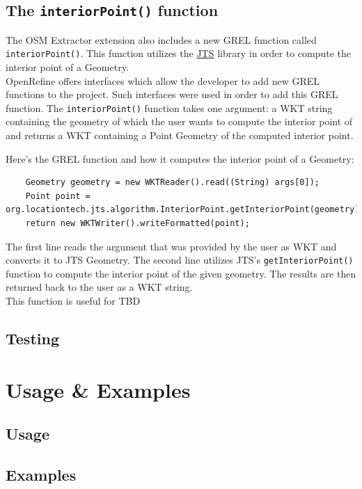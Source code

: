 \subsection{The \texttt{interiorPoint()} function}
The OSM Extractor extension also includes a new GREL function called \texttt{interiorPoint()}. This function
utilizes the \href{https://github.com/locationtech/jts}{JTS} library in order to compute the interior point of a Geometry.\\
\newline
OpenRefine offers interfaces which allow the developer to add new GREL functions to the project. Such interfaces were used in order
to add this GREL function. The \texttt{interiorPoint()} function takes one argument: a WKT string containing the geometry
of which the user wants to compute the interior point of and returns a WKT containing a Point Geometry of the computed interior point.\\
\newline

Here's the GREL function and how it computes the interior point of a Geometry:
\begin{verbatim}
    Geometry geometry = new WKTReader().read((String) args[0]);
    Point point = org.locationtech.jts.algorithm.InteriorPoint.getInteriorPoint(geometry);
    return new WKTWriter().writeFormatted(point);
\end{verbatim}
The first line reads the argument that was provided by the user as WKT and converts it to JTS Geometry.
The second line utilizes JTS's \texttt{getInteriorPoint()} function to compute the interior point of the
given geometry. The results are then returned back to the user as a WKT string.\\
\newline
This function is useful for TBD

\pagebreak
\subsection{Testing}
\lipsum[18-20]
\section{Usage \& Examples}
\lipsum[9-10]
\subsection{Usage}
\lipsum[18-20]
\subsection{Examples}
\lipsum[3-4]